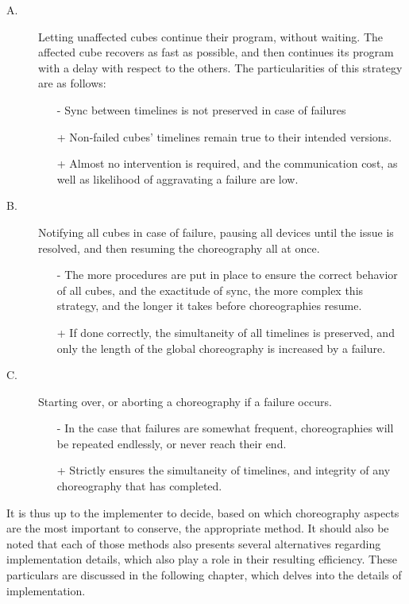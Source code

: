 \begin{description}
\item[A.] Letting unaffected cubes continue their program, without waiting. The affected cube recovers as fast as possible, and then continues its program with a delay with respect to the others.
The particularities of this strategy are as follows:

\begin{itemize}
\item[-] Sync between timelines is not preserved in case of failures
\item[+] Non-failed cubes' timelines remain true to their intended versions.
\item[+] Almost no intervention is required, and the communication cost, as well as likelihood of aggravating a failure are low.
\end{itemize}

\item[B.] Notifying all cubes in case of failure, pausing all devices until the issue is resolved, and then resuming the choreography all at once.

\begin{itemize}
\item[-] The more procedures are put in place to ensure the correct behavior of all cubes, and the exactitude of sync, the more complex this strategy, and the longer it takes before choreographies resume. 
\item[+] If done correctly, the simultaneity of all timelines is preserved, and only the length of the global choreography is increased by a failure.
\end{itemize}

\item[C.] Starting over, or aborting a choreography if a failure occurs.

\begin{itemize}
\item[-] In the case that failures are somewhat frequent, choreographies will be repeated endlessly, or never reach their end.
\item[+] Strictly ensures the simultaneity of timelines, and integrity of any choreography that has completed.
\end{itemize}

\end{description}

It is thus up to the implementer to decide, based on which choreography aspects are the most important to conserve, the appropriate method. It should also be noted that each of those methods also presents several alternatives regarding implementation details, which also play a role in their resulting efficiency. These particulars are discussed in the following chapter, which delves into the details of implementation.


